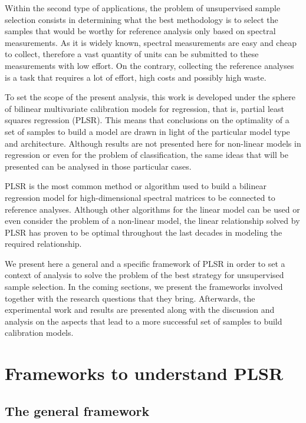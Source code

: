 \documentclass{article}
\begin{document}
Within the second type of applications, the problem of unsupervised sample selection consists in determining what the best methodology is to select the samples that would be worthy for reference analysis only based on spectral measurements. As it is widely known, spectral measurements are easy and cheap to collect, therefore a vast quantity of units can be submitted to these measurements with low effort. On the contrary, collecting the reference analyses is a task that requires a lot of effort, high costs and possibly high waste. 

To set the scope of the present analysis, this work is developed under the sphere of bilinear multivariate calibration models for regression, that is, partial least squares regression (PLSR). This means that conclusions on the optimality of a set of samples to build a model are drawn in light of the particular model type and architecture. Although results are not presented here for non-linear models in regression or even for the problem of classification, the same ideas that will be presented can be analysed in those particular cases. 

PLSR is the most common method or algorithm used to build a bilinear regression model for high-dimensional spectral matrices to be connected to reference analyses. Although other algorithms for the linear model can be used or even consider the problem of a non-linear model, the linear relationship solved by PLSR has proven to be optimal throughout the last decades in modeling the required relationship. 

We present here a general and a specific framework of PLSR in order to set a context of analysis to solve the problem of the best strategy for unsupervised sample selection. In the coming sections, we present the frameworks involved together with the research questions that they bring. Afterwards, the experimental work and results are presented along with the discussion and analysis on the aspects that lead to a more successful set of samples to build calibration models.


\section*{Frameworks to understand PLSR}

\subsection*{The general framework}
\end{document}
